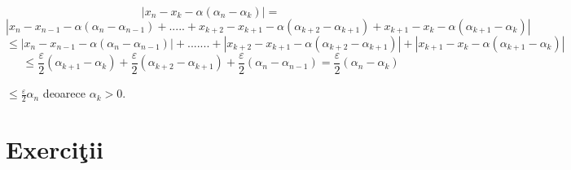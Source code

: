 \documentclass[a4paper,12pt,oneside]{report}
\begin{document}
\begin{displaymath}
  \left | x_{n} - x_{k} - \alpha \left ( \alpha _{n}-\alpha _{k} \right ) \right |= 
\end{displaymath}
\begin{displaymath}
  \left | x_{n} - x_{n-1} -\alpha \left ( \alpha _{n}-\alpha _{n-1} \right )+.....+x_{k+2}-x_{k+1}-\alpha \left ( \alpha _{k+2}-\alpha _{k+1} \right )  +x_{k+1}-x_{k}-\alpha \left ( \alpha _{k+1}-\alpha _{k} \right )\right |
\end{displaymath}
\begin{displaymath}
  \leq \left | x_{n}-x_{n-1}-\alpha \left ( \alpha _{n}-\alpha _{n-1} \right ) \right |+.......+\left | x_{k+2}-x_{k+1}-\alpha \left ( \alpha _{k+2}-\alpha _{k+1} \right ) \right |+\left | x_{k+1}-x_{k}- \alpha \left ( \alpha _{k+1}-\alpha _{k} \right ) \right |
\end{displaymath}
\begin{displaymath}
  \leq \frac{\varepsilon }{2}\left ( \alpha _{k+1} -\alpha _{k} \right )+\frac{\varepsilon }{2}\left ( \alpha _{k+2}-\alpha _{k+1} \right )+\frac{\varepsilon }{2}\left ( \alpha _{n}- \alpha _{n-1}\right )= \frac{\varepsilon }{2}\left ( \alpha _{n}-\alpha _{k} \right )
\end{displaymath}

\(\leq \frac{\varepsilon }{2}\alpha _{n}\) deoarece \(\alpha _{k}> 0\). 


\section{Exerci\c tii}
\end{document}

